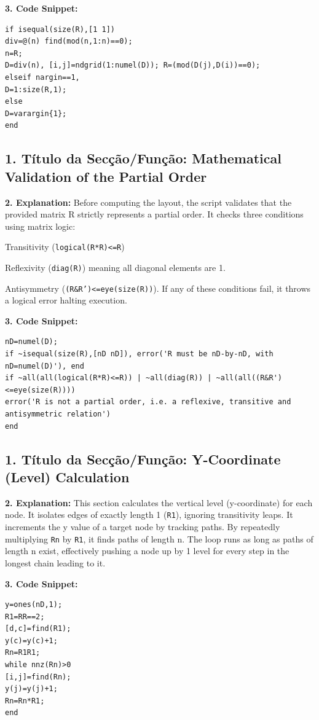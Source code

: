 \textbf{3. Code Snippet:}
\begin{lstlisting}
if isequal(size(R),[1 1])
div=@(n) find(mod(n,1:n)==0);
n=R;
D=div(n), [i,j]=ndgrid(1:numel(D)); R=(mod(D(j),D(i))==0);
elseif nargin==1,
D=1:size(R,1);
else
D=varargin{1};
end
\end{lstlisting}

\vspace{0.5cm}

\subsection*{1. Título da Secção/Função: Mathematical Validation of the Partial Order}
\textbf{2. Explanation:} Before computing the layout, the script validates that the provided matrix R strictly represents a partial order. It checks three conditions using matrix logic:

Transitivity (\texttt{logical(R*R)<=R})

Reflexivity (\texttt{diag(R)}) meaning all diagonal elements are 1.

Antisymmetry (\texttt{(R\&R')<=eye(size(R))}).
If any of these conditions fail, it throws a logical error halting execution.

\textbf{3. Code Snippet:}
\begin{lstlisting}
nD=numel(D);
if ~isequal(size(R),[nD nD]), error('R must be nD-by-nD, with nD=numel(D)'), end
if ~all(all(logical(R*R)<=R)) | ~all(diag(R)) | ~all(all((R&R')<=eye(size(R))))
error('R is not a partial order, i.e. a reflexive, transitive and antisymmetric relation')
end
\end{lstlisting}

\vspace{0.5cm}

\subsection*{1. Título da Secção/Função: Y-Coordinate (Level) Calculation}
\textbf{2. Explanation:} This section calculates the vertical level (y-coordinate) for each node. It isolates edges of exactly length 1 (\texttt{R1}), ignoring transitivity leaps. It increments the y value of a target node by tracking paths. By repeatedly multiplying \texttt{Rn} by \texttt{R1}, it finds paths of length n. The loop runs as long as paths of length n exist, effectively pushing a node up by 1 level for every step in the longest chain leading to it.

\textbf{3. Code Snippet:}
\begin{lstlisting}
y=ones(nD,1);
R1=RR==2;
[d,c]=find(R1);
y(c)=y(c)+1;
Rn=R1R1;
while nnz(Rn)>0
[i,j]=find(Rn);
y(j)=y(j)+1;
Rn=Rn*R1;
end
\end{lstlisting}

